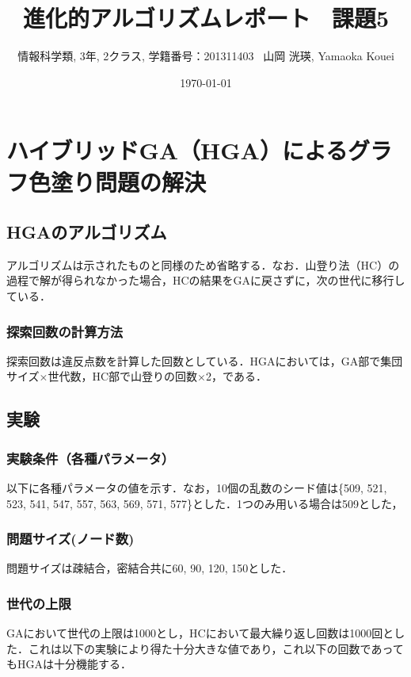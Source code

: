 \documentclass[a4j]{jarticle}
\title{進化的アルゴリズムレポート \ 課題5}
\author{情報科学類, 3年, 2クラス, 学籍番号：201311403 \ 山岡 洸瑛, Yamaoka
Kouei}
\date{\today}
\begin{document}
\begin{titlepage}
\maketitle 
\thispagestyle{empty}
\end{titlepage}
\setcounter{tocdepth}{3}
\tableofcontents
\newpage
\section{ハイブリッドGA（HGA）によるグラフ色塗り問題の解決}

\subsection{HGAのアルゴリズム}
アルゴリズムは示されたものと同様のため省略する．なお．山登り法（HC）の過程で解が得られなかった場合，HCの結果をGAに戻さずに，次の世代に移行している．

\subsubsection{探索回数の計算方法}
探索回数は違反点数を計算した回数としている．HGAにおいては，GA部で集団サイズ$\times$世代数，HC部で山登りの回数$\times$2，である．

\subsection{実験}
\subsubsection{実験条件（各種パラメータ）}
以下に各種パラメータの値を示す．なお，10個の乱数のシード値は\{509, 521, 523, 541,
547, 557, 563, 569, 571, 577\}とした．1つのみ用いる場合は509とした，

\subsubsection{問題サイズ(ノード数)}
問題サイズは疎結合，密結合共に60, 90, 120, 150とした．

\subsubsection{世代の上限}
GAにおいて世代の上限は1000とし，HCにおいて最大繰り返し回数は1000回とした．これは以下の実験により得た十分大きな値であり，これ以下の回数であってもHGAは十分機能する．
\end{document}
